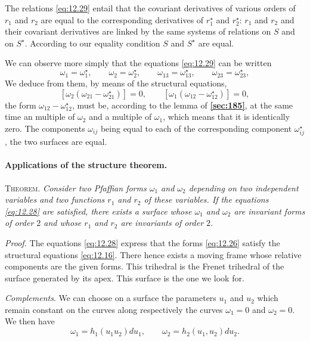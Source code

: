 \documentclass[leqno,11pt]{book}
\numberwithin{equation}{chapter}
\theoremstyle{shape1}
\theoremstyle{shapesmall}
\newcommand{\fsref}[1]{{\rm\textsection\textbf{\ref{sec:#1}}}}
\newcommand{\str}{^{\star}}
\newcommand{\somespace}{\vspace{9pt}}
\begin{document}
The relations \eqref{eq:12.29} entail that the covariant derivatives of various orders of $r_{1}$ and $r_{2}$ are equal to the corresponding derivatives of $r_{1}\str$ and $r_{2}\str$: $r_{1}$ and $r_{2}$ and their covariant derivatives are linked by the same systems of relations on $S$ and on $S\str$. According to our equality condition $S$ and $S\str$ are equal.

We can observe more simply that the equations \eqref{eq:12.29} can be written
\[
\omega_{1}=\omega_{1}\str,\qquad\omega_{2}=\omega_{2}\str,\qquad\omega_{13}=\omega_{13}\str,\qquad\omega_{23}=\omega_{23}\str,
\]
We deduce from them, by means of the structural equations,
\[
[\omega_{2}(\omega_{21}-\omega_{21}\str)]=0,\qquad[\omega_{1}(\omega_{12}-\omega_{12}\str)]=0,
\]
the form $\omega_{12}-\omega_{12}\str$, must be, according to the lemma of \fsref{185}, at the same time an multiple of $\omega_{2}$ and a multiple of $\omega_{1}$, which means that it is identically zero. The components $\omega_{ij}$ being equal to each of the corresponding component $\omega_{ij}\str$, the two surfaces are equal.

\paragraph[{Applications of the structure theorem.}]{Applications of the structure theorem.}
\label{sec:190}
\textsc{Theorem.} \emph{Consider two Pfaffian forms $\omega_{1}$ and $\omega_{2}$ depending on two independent variables and two functions $r_{1}$ and $r_{2}$ of these variables. If the equations \eqref{eq:12.28} are satisfied, there exists a surface whose $\omega_{1}$ and $\omega_{2}$ are invariant forms of order $2$ and whose $r_{1}$ and $r_{2}$ are invariants of order $2$.}

\somespace

\emph{Proof.} The equations \eqref{eq:12.28} express that the forms \eqref{eq:12.26} satisfy the structural equations \eqref{eq:12.16}. There hence exists a moving frame whose relative components are the given forms. This trihedral is the Frenet trihedral of the surface generated by its apex. This surface is the one we look for.

\somespace

\emph{Complements}. We can choose on a surface the parameters $u_{1}$ and $u_{2}$ which remain constant on the curves along respectively the curves $\omega_{1}=0$ and $\omega_{2}=0$. We then have
\[
\omega_{1}=h_{1}(u_{1}u_{2})du_{1},\qquad\omega_{2}=h_{2}(u_{1},u_{2})du_{2}.
\]
\end{document}
